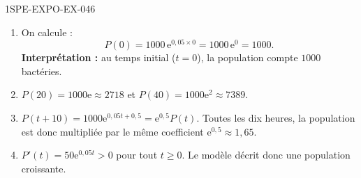 \begin{corrige}{1SPE-EXPO-EX-046}
\begin{enumerate}
\item On calcule :
\[P(0) = 1000\,\mathrm{e}^{0{,}05 \times 0} = 1000\,\mathrm{e}^0 = 1000.\]
\textbf{Interprétation :} au temps initial ($t = 0$), la population compte $1000$ bactéries.

\item $P(20)=1000\mathrm{e}\approx\boxed{2718}$ et $P(40)=1000\mathrm{e}^{2}\approx\boxed{7389}$.

\item $P(t+10)=1000\mathrm{e}^{0{,}05t+0{,}5}=\mathrm{e}^{0{,}5}P(t)$. Toutes les dix heures, la population est donc multipliée par le même coefficient $\mathrm{e}^{0{,}5}\approx1{,}65$.

\item $P'(t)=50\mathrm{e}^{0{,}05t}>0$ pour tout $t\geqslant0$. Le modèle décrit donc une population croissante.
\end{enumerate}
\end{corrige}
